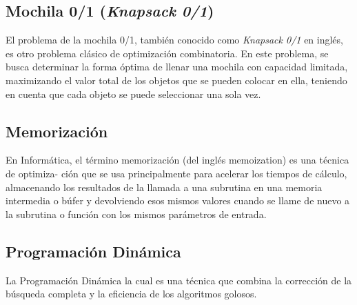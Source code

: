 \subsection{Mochila 0/1 (\emph{Knapsack 0/1})}
El problema de la mochila 0/1, también conocido como \emph{Knapsack 0/1} en inglés, es otro problema clásico de optimización combinatoria. En este problema, se busca determinar la forma óptima de llenar una mochila con capacidad limitada, maximizando el valor total de los objetos que se pueden colocar en ella, teniendo en cuenta que cada objeto se puede seleccionar una sola vez.

\subsection{Memorización}
En Informática, el término memorización (del inglés memoization) es una técnica de optimiza-
ción que se usa principalmente para acelerar los tiempos de cálculo, almacenando los resultados
de la llamada a una subrutina en una memoria intermedia o búfer y devolviendo esos mismos
valores cuando se llame de nuevo a la subrutina o función con los mismos parámetros de entrada.

\subsection{Programación Dinámica}
La Programación Dinámica la cual es una técnica que combina la corrección de la búsqueda
completa y la eficiencia de los algoritmos golosos.